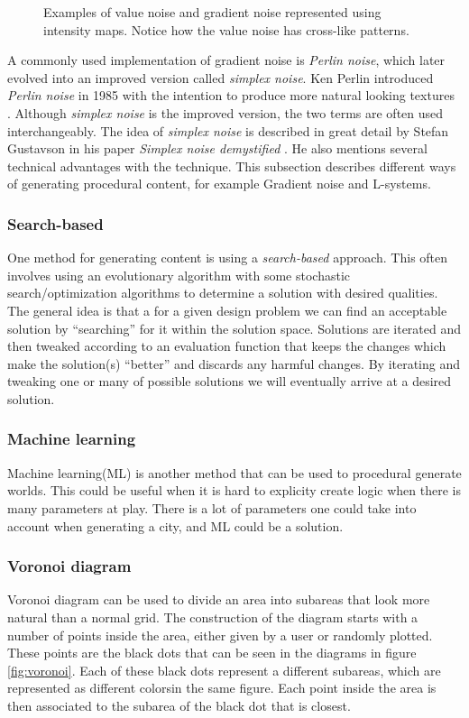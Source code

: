 \begin{figure}[h!]
  \caption{Examples of value noise and gradient noise represented using intensity maps. Notice how the value noise has cross-like patterns.}
  \label{fig:noisetypes}
\end{figure}

A commonly used implementation of gradient noise is \textit{Perlin noise}, which later evolved into an improved version called \textit{simplex noise}.
Ken Perlin introduced \textit{Perlin noise} in 1985 with the intention to produce more natural looking textures \cite{perlin_noise}.
Although \textit{simplex noise} is the improved version, the two terms are often used interchangeably. The idea of \textit{simplex noise} is described in great detail by Stefan Gustavson in his paper \textit{Simplex noise demystified} \cite{simplex_noise}.
He also mentions several technical advantages with the technique.
This subsection describes different ways of generating procedural content, for example Gradient noise and L-systems.

\subsubsection{Search-based}
One method for generating content is using a \textit{search-based} approach.
This often involves using an evolutionary algorithm with some stochastic search/optimization algorithms to determine a solution with desired qualities.
The general idea is that a for a given design problem we can find an acceptable solution by ``searching'' for it within the solution space.
Solutions are iterated and then tweaked according to an evaluation function that keeps the changes which make the solution(s) ``better'' and discards any harmful changes.
By iterating and tweaking one or many of possible solutions we will eventually arrive at a desired solution.

\subsubsection{Machine learning}
Machine learning(ML) is another method that can be used to procedural generate worlds. 
This could be useful when it is hard to explicity create logic when there is many parameters at play.
There is a lot of parameters one could take into account when generating a city, and ML could be a solution.

\subsubsection{Voronoi diagram}
Voronoi diagram can be used to divide an area into subareas that look more natural than a normal grid. 
The construction of the diagram starts with a number of points inside the area, either given by a user or randomly plotted. 
These points are the black dots that can be seen in the diagrams in figure \ref{fig:voronoi}.
Each of these black dots represent a different subareas, which are represented as different colorsin the same figure.
Each point inside the area is then associated to the subarea of the black dot that is closest.

